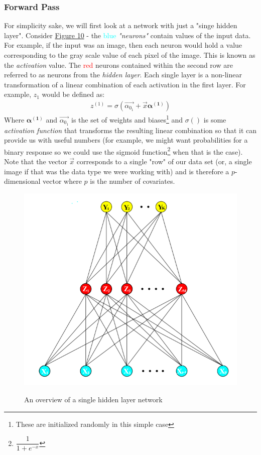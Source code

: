 \documentclass{article}
\begin{document}
\subsubsection{Forward Pass}

\noindent For simplicity sake, we will first look at a network with just a "singe hidden layer". Consider \hyperref[fig:nn1]{Figure 10} - the \textcolor{cyan}{blue} \textit{"neurons"} contain values of the input data. For example, if the input was an image, then each neuron would hold a value corresponding to the gray scale value of each pixel of the image. This is known as the \textit{activation} value. The \textcolor{red}{red} neurons contained within the second row are referred to as neurons from the \textit{hidden layer}. Each single layer is a non-linear transformation of a linear combination of each activation in the first layer. For example, $z_1$ would be defined as:
\begin{align}
    z^{(1)} = \sigma(\vec{\alpha_{0_{1}}} + \vec{x}\boldsymbol{\alpha^{(1)}})
\end{align}
\noindent Where $\boldsymbol{\alpha^{(1)}}$ and $\vec{\alpha_{0_{1}}}$ is the set of weights and biases\footnote{These are initialized randomly in this simple case} and $\sigma()$ is some \textit{activation function} that transforms the resulting linear combination so that it can provide us with useful numbers (for example, we might want probabilities for a binary response so we could use the sigmoid function\footnote{$\dfrac{1}{1 + e^{-x}}$} when that is the case). Note that the vector $\vec{x}$ corresponds to a single "row" of our data set (or, a single image if that was the data type we were working with) and is therefore a $p$-dimensional vector where $p$ is the number of covariates.

\begin{figure}[h!]
  \centering
  \includegraphics[scale = 0.75]{nn1.png}
  \label{fig:nn1}
  \caption{An overview of a single hidden layer network \cite{ESL}}
\end{figure}
\end{document}
